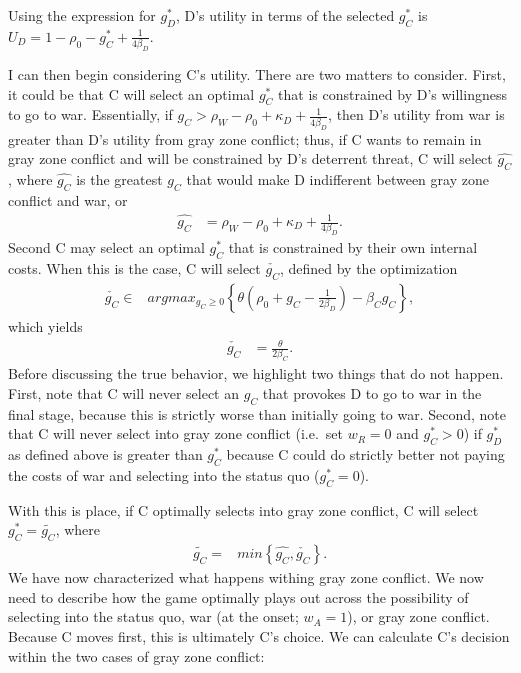 \documentclass[
]{article}
\begin{document}
Using the expression for \(g_{D}^{*}\), D's utility in terms of the selected \(g_{C}^{*}\) is \(U_{D}=1-\rho_{0}-g_{C}^{*}+\frac{1}{4\beta_{D}}\).

I can then begin considering C's utility. There are two matters to consider. First, it could be that C will select an optimal \(g_{C}^{*}\) that is constrained by D's willingness to go to war. Essentially, if \(g_{C}>\rho_{W}-\rho_{0}+\kappa_{D}+\frac{1}{4\beta_{D}}\), then D's utility from war is greater than D's utility from gray zone conflict; thus, if C wants to remain in gray zone conflict and will be constrained by D's deterrent threat, C will select \(\hat{g_{C}}\), where \(\hat{g_{C}}\) is the greatest \(g_{C}\) that would make D indifferent between gray zone conflict and war, or
\begin{align*}
  \hat{g_{C}} & =\rho_{W}-\rho_{0}+\kappa_{D}+\frac{1}{4\beta_{D}}.
  \end{align*}
Second C may select an optimal \(g_{C}^{*}\) that is constrained by their own internal costs. When this is the case, C will select \(\check{g_{C}}\), defined by the optimization
\begin{align*}
  \check{g_{C}}\in & argmax_{g_{C}\geq0}\left\{ \theta\left(\rho_{0}+g_{C}-\frac{1}{2\beta_{D}}\right)-\beta_{C}g_{C}\right\},
  \end{align*}
which yields
\begin{align*}
  \check{g_{C}} & =\frac{\theta}{2\beta_{C}}.
  \end{align*}
Before discussing the true behavior, we highlight two things that do not happen. First, note that C will never select an \(g_{C}\) that provokes D to go to war in the final stage, because this is strictly worse than initially going to war. Second, note that C will never select into gray zone conflict (i.e.~set \(w_{R}=0\) and \(g_{C}^{*}>0\)) if \(g_{D}^{*}\) as defined above is greater than \(g_{C}^{*}\) because C could do strictly better not paying the costs of war and selecting into the status quo (\(g_{C}^{*}=0\)).

With this is place, if C optimally selects into gray zone conflict, C will select \(g_{C}^{*}=\tilde{g_{C}}\), where
\begin{align*}
  \tilde{g_{C}}= & min\left\{ \hat{g_{C}},\check{g_{C}}\right\} .
  \end{align*}
We have now characterized what happens withing gray zone conflict. We now need to describe how the game optimally plays out across the possibility of selecting into the status quo, war (at the onset; \(w_{A}=1\)), or gray zone conflict. Because C moves first, this is ultimately C's choice. We can calculate C's decision within the two cases of gray zone conflict:
\end{document}

